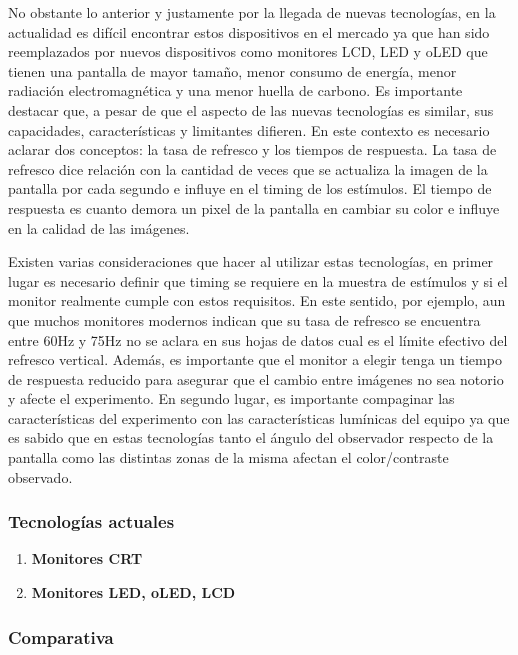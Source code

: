 \documentclass[../main.tex]{subfiles}
\begin{document}
		No obstante lo anterior y justamente por la llegada de nuevas tecnologías, en la actualidad es difícil encontrar estos dispositivos en el mercado ya que han sido reemplazados por nuevos dispositivos como monitores LCD, LED y oLED que tienen una pantalla de mayor tamaño, menor consumo de energía, menor radiación electromagnética y una menor huella de carbono. Es importante destacar que, a pesar de que el aspecto de las nuevas tecnologías es similar, sus capacidades, características y limitantes difieren. En este contexto es necesario aclarar dos conceptos: la tasa de refresco y los tiempos de respuesta. La tasa de refresco dice relación con la cantidad de veces que se actualiza la imagen de la pantalla por cada segundo e influye en el timing de los estímulos. El tiempo de respuesta es cuanto demora un pixel de la pantalla en cambiar su color e influye en la calidad de las imágenes.

		Existen varias consideraciones que hacer al utilizar estas tecnologías, en primer lugar es necesario definir que timing se requiere en la muestra de estímulos y si el monitor realmente cumple con estos requisitos. En este sentido, por ejemplo, aun que muchos monitores modernos indican que su tasa de refresco se encuentra entre 60Hz y 75Hz no se aclara en sus hojas de datos cual es el límite efectivo del refresco vertical. Además, es importante que el monitor a elegir tenga un tiempo de respuesta reducido para asegurar que el cambio entre imágenes no sea notorio y afecte el experimento. En segundo lugar, es importante compaginar las características del experimento con las características lumínicas del equipo ya que es sabido que en estas tecnologías tanto el ángulo del observador respecto de la pantalla como las distintas zonas de la misma afectan el color/contraste observado.

			\subsubsection{Tecnologías actuales} 
			\label{ssub:02_tecnologias_actuales}
				\begin{enumerate}
					\item \textbf{Monitores CRT}

					\item \textbf{Monitores LED, oLED, LCD}

				\end{enumerate}

			\subsubsection{Comparativa}
			\label{ssub:02_comparativa_monitores}
			
\end{document}
